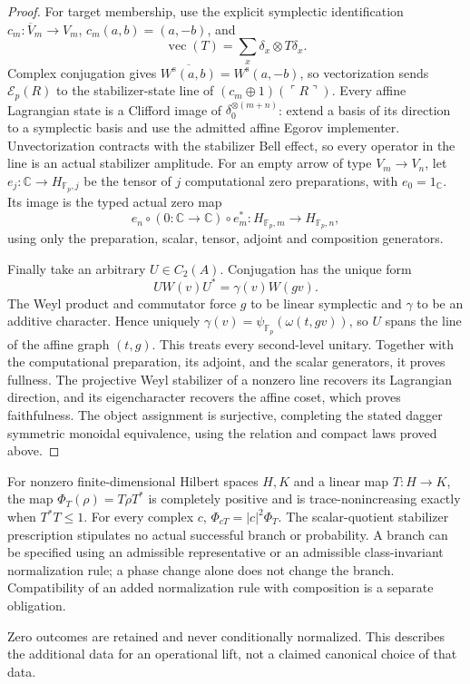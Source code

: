 \begin{proof}
For target membership, use the explicit symplectic identification
$c_m:\overline V_m\to V_m$, $c_m(a,b)=(a,-b)$, and
\[
 \operatorname{vec}(T)=\sum_x\delta_x\otimes T\delta_x.
\]
Complex conjugation gives
$\overline{W^{\mathrm s}(a,b)}=W^{\mathrm s}(a,-b)$, so vectorization sends
$\mathcal E_p(R)$ to the stabilizer-state line of
$(c_m\oplus1)(\ulcorner R\urcorner)$.  Every affine Lagrangian state is a
Clifford image of $\delta_0^{\otimes(m+n)}$: extend a basis of its direction
to a symplectic basis and use the admitted affine Egorov implementer.
Unvectorization contracts with the stabilizer Bell effect, so every operator
in the line is an actual stabilizer amplitude.
For an empty arrow of type $V_m\to V_n$, let
$e_j:\mathbb C\to H_{\mathbb F_p,j}$ be the tensor of $j$ computational
zero preparations, with $e_0=1_{\mathbb C}$.  Its image is the typed actual
zero map
\[
 e_n\circ(0:\mathbb C\to\mathbb C)\circ e_m^*:
 H_{\mathbb F_p,m}\longrightarrow H_{\mathbb F_p,n},
\]
using only the preparation, scalar, tensor, adjoint and composition
generators.

Finally take an arbitrary $U\in C_2(A)$.  Conjugation has the unique form
\[
 U W(v)U^*=\gamma(v)W(gv).
\]
The Weyl product and commutator force $g$ to be linear symplectic and
$\gamma$ to be an additive character.  Hence uniquely
$\gamma(v)=\psi_{\mathbb F_p}(\omega(t,gv))$, so $U$ spans the line of the
affine graph $(t,g)$.  This treats every second-level unitary.  Together with
the computational preparation, its adjoint, and the scalar generators, it
proves fullness.  The projective Weyl stabilizer of a nonzero line recovers
its Lagrangian direction, and its eigencharacter recovers the affine coset,
which proves faithfulness.  The object assignment is surjective, completing
the stated dagger symmetric monoidal equivalence, using the relation and
compact laws proved above.
\end{proof}

\pagebreak[3]
\begin{proposition}
\statusProved{}
For nonzero finite-dimensional Hilbert spaces $H,K$ and a linear map $T:H\to K$, the
map $\Phi_T(\rho)=T\rho T^*$ is completely positive and is trace-nonincreasing
exactly when $T^*T\leq1$. For every complex $c$, $\Phi_{cT}=\lvert c\rvert^2\Phi_T$.
The scalar-quotient stabilizer prescription stipulates no actual successful branch or probability. A branch can be specified using an admissible representative or an admissible class-invariant normalization rule; a phase change alone does not change the branch. Compatibility of an added normalization rule with composition is a separate obligation.
\end{proposition}
\begin{scope}
Zero outcomes are retained and never conditionally normalized. This describes the additional data for an operational lift, not a claimed canonical choice of that data.
\end{scope}

